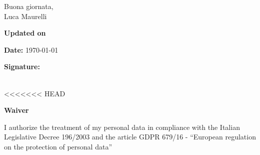\documentclass[10pt]{article}
\begin{document}
Buona giornata,\\
Luca Maurelli
\vfill
{\centering \textbf{Updated on} \par}
\begin{minipage}[t]{.49\textwidth}
	\raggedright
	{\textbf{Date:} \textsc{\today}\par}
\end{minipage}%
\hfill
\begin{minipage}[t]{.49\textwidth}
	\raggedleft
	{\textbf{Signature:}\hspace{5cm} \par}
\end{minipage}
\vspace{3cm}\\
<<<<<<< HEAD
{\centering \textbf{Waiver} \par}
{\small I authorize the treatment of my personal data in compliance with the Italian Legislative Decree 196/2003 and the article GDPR 679/16 - “European regulation on the protection of personal data”}
\end{document}

